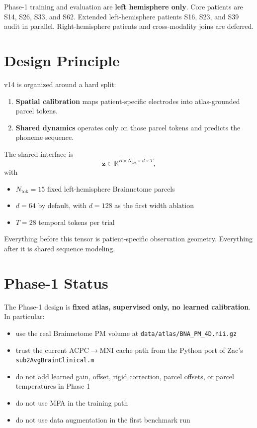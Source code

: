 \documentclass[11pt,letterpaper]{article}
\newcommand{\R}{\mathbb{R}}
\newcommand{\bz}{\mathbf{z}}
\begin{document}
Phase-1 training and evaluation are \textbf{left hemisphere only}. Core patients are S14, S26, S33, and S62. Extended left-hemisphere patients S16, S23, and S39 audit in parallel. Right-hemisphere patients and cross-modality joins are deferred.


\section{Design Principle}

v14 is organized around a hard split:
\begin{enumerate}[leftmargin=2em, itemsep=0.2em]
\item \textbf{Spatial calibration} maps patient-specific electrodes into atlas-grounded parcel tokens.
\item \textbf{Shared dynamics} operates only on those parcel tokens and predicts the phoneme sequence.
\end{enumerate}

The shared interface is
\begin{equation}
\bz \in \R^{B \times N_{\text{tok}} \times d \times T},
\end{equation}
with
\begin{itemize}[leftmargin=2em, itemsep=0.2em]
\item $N_{\text{tok}} = 15$ fixed left-hemisphere Brainnetome parcels
\item $d = 64$ by default, with $d=128$ as the first width ablation
\item $T = 28$ temporal tokens per trial
\end{itemize}

Everything before this tensor is patient-specific observation geometry. Everything after it is shared sequence modeling.


\section{Phase-1 Status}

The Phase-1 design is \textbf{fixed atlas, supervised only, no learned calibration}. In particular:
\begin{itemize}[leftmargin=2em, itemsep=0.2em]
\item use the real Brainnetome PM volume at \texttt{data/atlas/BNA\_PM\_4D.nii.gz}
\item trust the current ACPC$\to$MNI cache path from the Python port of Zac's \texttt{sub2AvgBrainClinical.m}
\item do not add learned gain, offset, rigid correction, parcel offsets, or parcel temperatures in Phase 1
\item do not use MFA in the training path
\item do not use data augmentation in the first benchmark run
\end{itemize}
\end{document}
